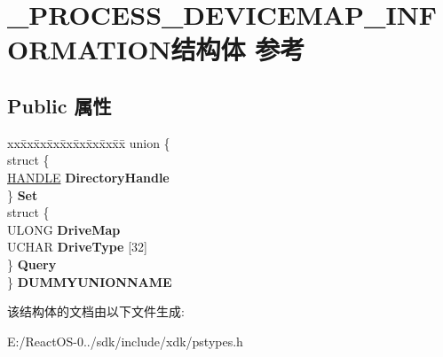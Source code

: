 \hypertarget{struct___p_r_o_c_e_s_s___d_e_v_i_c_e_m_a_p___i_n_f_o_r_m_a_t_i_o_n}{}\section{\+\_\+\+P\+R\+O\+C\+E\+S\+S\+\_\+\+D\+E\+V\+I\+C\+E\+M\+A\+P\+\_\+\+I\+N\+F\+O\+R\+M\+A\+T\+I\+O\+N结构体 参考}
\label{struct___p_r_o_c_e_s_s___d_e_v_i_c_e_m_a_p___i_n_f_o_r_m_a_t_i_o_n}
\subsection*{Public 属性}
\begin{DoxyCompactItemize}
\item 
\mbox{\label{struct___p_r_o_c_e_s_s___d_e_v_i_c_e_m_a_p___i_n_f_o_r_m_a_t_i_o_n_a1fe0bfa73ca0d15f0fca738b07763f05}} 
\begin{tabbing}
xx\=xx\=xx\=xx\=xx\=xx\=xx\=xx\=xx\=\kill
union \{\\
\>struct \{\\
\>\>\hyperlink{interfacevoid}{HANDLE} {\bfseries DirectoryHandle}\\
\>\} {\bfseries Set}\\
\>struct \{\\
\>\>ULONG {\bfseries DriveMap}\\
\>\>UCHAR {\bfseries DriveType} \mbox{[}32\mbox{]}\\
\>\} {\bfseries Query}\\
\} {\bfseries DUMMYUNIONNAME}\\

\end{tabbing}\end{DoxyCompactItemize}


该结构体的文档由以下文件生成\+:\begin{DoxyCompactItemize}
\item 
E\+:/\+React\+O\+S-\/0../sdk/include/xdk/pstypes.\+h\end{DoxyCompactItemize}

